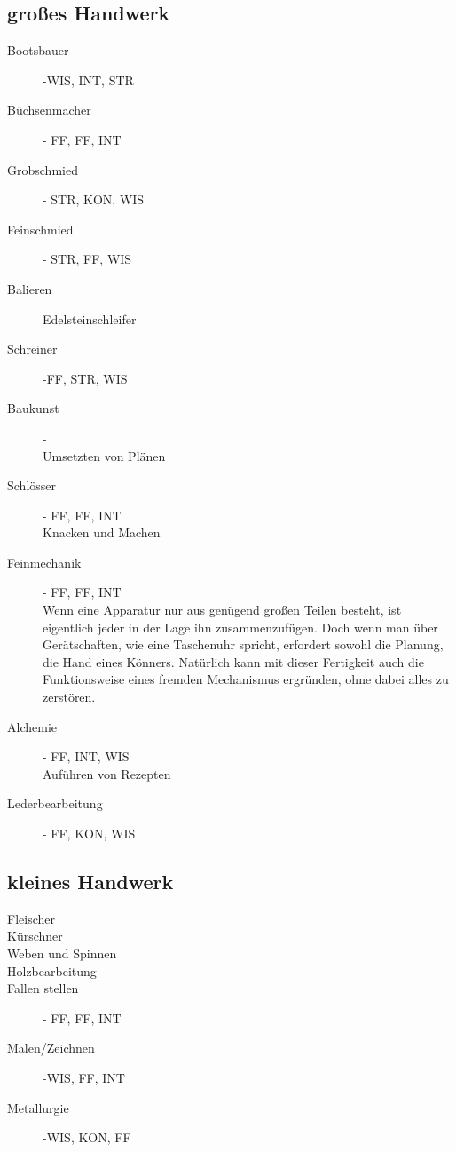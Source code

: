 \documentclass[a4paper,12pt,oneside]{book}
\begin{document}
\subsection{großes Handwerk}
\begin{description}
\item[Bootsbauer]-WIS, INT, STR
\item[Büchsenmacher]- FF, FF, INT
\item[Grobschmied]- STR, KON, WIS 
\item[Feinschmied]- STR, FF, WIS
\item[Balieren]Edelsteinschleifer
\item[Schreiner]-FF, STR, WIS
\item[Baukunst]-
\\Umsetzten von Plänen
\item[Schlösser]- FF, FF, INT
\\Knacken und Machen
\item[Feinmechanik]- FF, FF, INT
\\Wenn eine Apparatur nur aus genügend großen Teilen besteht, ist eigentlich jeder in der Lage ihn zusammenzufügen. Doch wenn man über Gerätschaften, wie eine Taschenuhr spricht, erfordert sowohl die Planung, die Hand eines Könners. Natürlich kann mit dieser Fertigkeit auch die Funktionsweise eines fremden Mechanismus ergründen, ohne dabei alles zu zerstören.
\item[Alchemie]- FF, INT, WIS
\\Auführen von Rezepten
\item[Lederbearbeitung]- FF, KON, WIS
\end{description}
\subsection{kleines Handwerk}
\begin{description}
\item[Fleischer]
\item[Kürschner]
\item[Weben und Spinnen]
\item[Holzbearbeitung]
\item[Fallen stellen]- FF, FF, INT
\item[Malen/Zeichnen]-WIS, FF, INT
\item[Metallurgie]-WIS, KON, FF
\end{description}
\end{document}
